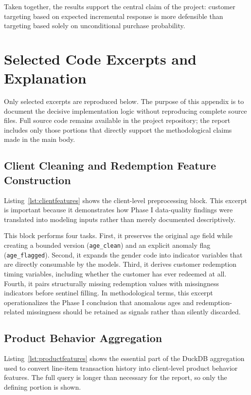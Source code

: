 \documentclass[11pt,a4paper]{article}
\begin{document}
Taken together, the results support the central claim of the project: customer targeting based on expected incremental response is more defensible than targeting based solely on unconditional purchase probability.

\appendix
\section{Selected Code Excerpts and Explanation}
Only selected excerpts are reproduced below. The purpose of this appendix is to document the decisive implementation logic without reproducing complete source files. Full source code remains available in the project repository; the report includes only those portions that directly support the methodological claims made in the main body.

\subsection{Client Cleaning and Redemption Feature Construction}
Listing~\ref{lst:clientfeatures} shows the client-level preprocessing block. This excerpt is important because it demonstrates how Phase I data-quality findings were translated into modeling inputs rather than merely documented descriptively.



This block performs four tasks. First, it preserves the original age field while creating a bounded version (\texttt{age\_clean}) and an explicit anomaly flag (\texttt{age\_flagged}). Second, it expands the gender code into indicator variables that are directly consumable by the models. Third, it derives customer redemption timing variables, including whether the customer has ever redeemed at all. Fourth, it pairs structurally missing redemption values with missingness indicators before sentinel filling. In methodological terms, this excerpt operationalizes the Phase I conclusion that anomalous ages and redemption-related missingness should be retained as signals rather than silently discarded.

\subsection{Product Behavior Aggregation}
Listing~\ref{lst:productfeatures} shows the essential part of the DuckDB aggregation used to convert line-item transaction history into client-level product behavior features. The full query is longer than necessary for the report, so only the defining portion is shown.
\end{document}
